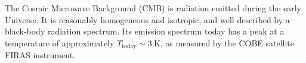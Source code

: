 The Cosmic Microwave Background (CMB) is radiation emitted during the early Universe. It is reasonably homogeneous and isotropic, and well described by a black-body radiation spectrum. Its emission spectrum today has a peak at a temperature of approximately $T_{\mathrm{today}} \sim \SI{3}{\K}$, as measured by the COBE satellite FIRAS instrument.
    
